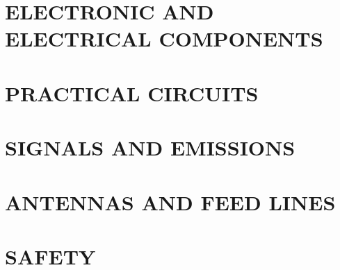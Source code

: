 \documentclass[12pt]{book}
\begin{document}
\chapter{ELECTRONIC AND ELECTRICAL COMPONENTS}
\label{chapter:electronic_and_electrical_components}
\chapter{PRACTICAL CIRCUITS}
\label{chapter:practical_circuits}
\chapter{SIGNALS AND EMISSIONS}
\label{chapter:signals_and_emissions}
\chapter{ANTENNAS AND FEED LINES}
\label{chapter:antennas_and_feed_lines}
\chapter{SAFETY}
\label{chapter:safety}
\end{document}

